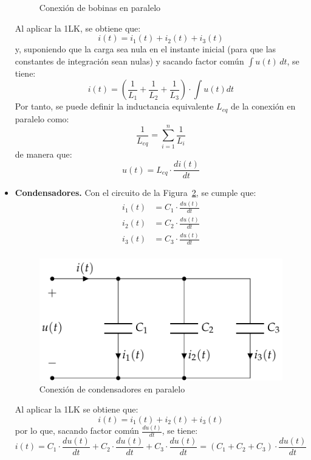 \documentclass[11pt]{book} %
\numberwithin{dummy}{section}
\theoremstyle{ocrenumbox}
\theoremstyle{blacknumex}
\theoremstyle{blacknumbox}
\theoremstyle{ocrenum}
\begin{document}
\begin{itemize}
\begin{figure}[htbp]
			\caption{Conexión de bobinas en paralelo}
			\label{fig.bobinas-paralelo}
		\end{figure}
		Al aplicar la 1LK, se obtiene que: 
		\begin{equation*}
			i(t) = i_1(t) + i_2(t) + i_3(t)
		\end{equation*}
		y, suponiendo que la carga sea nula en el instante inicial (para que las constantes de integración sean nulas) y sacando factor común $\int u(t)\,dt$, se tiene:
		\begin{equation*}
			i(t)=\left(\dfrac{1}{L_1}+\dfrac{1}{L_2}+\dfrac{1}{L_3} \right)\cdot \int u(t) dt
		\end{equation*}
		Por tanto, se puede definir la inductancia equivalente $L_{eq}$ de la conexión en paralelo como:
		\begin{equation}
			\boxed{\dfrac{1}{L_{eq}} = \sum_{i = 1}^n \dfrac{1}{L_i}}
		\end{equation}
		de manera que:
		\begin{equation*}
			u(t) = L_{eq} \cdot \dfrac{di(t)}{dt}
		\end{equation*}
		\item \textbf{Condensadores.} Con el circuito de la Figura~\ref{fig.condensadores-paralelo}, se cumple que:
		\begin{align*}
			i_1(t) &= C_1 \cdot \frac{du(t)}{dt}\\
			i_2(t) &= C_2 \cdot \frac{du(t)}{dt}\\
			i_3(t) &= C_3 \cdot \frac{du(t)}{dt}\\
		\end{align*}
		\begin{figure}[htbp]
			\centering
			\includegraphics[width=0.4\linewidth]{../figs/CondensadoresParalelo.pdf}
			\caption{Conexión de condensadores en paralelo}
			\label{fig.condensadores-paralelo}
		\end{figure}
		Al aplicar la 1LK se obtiene que: 
		\begin{equation*}
			i(t) = i_1(t) + i_2(t) + i_3(t)
		\end{equation*}
		por lo que, sacando factor común $\frac{du(t)}{dt}$, se tiene:
		\begin{equation*}
			i(t)=C_1\cdot \dfrac{du(t)}{dt}+ C_2\cdot \dfrac{du(t)}{dt}+ C_3\cdot \dfrac{du(t)}{dt}=(C_1+C_2+C_3)\cdot\dfrac{du(t)}{dt}

\end{equation*}
\end{itemize}
\end{document}
